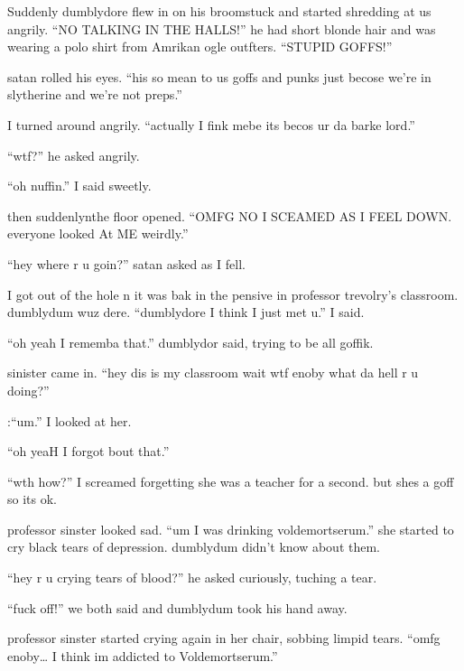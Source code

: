 Suddenly dumblydore flew in on his broomstuck and started shredding at us angrily. \enquote{NO TALKING IN THE HALLS\@!} he had short blonde hair and was wearing a polo shirt from Amrikan ogle outfters. \enquote{STUPID GOFFS\@!}

satan rolled his eyes. \enquote{his so mean to us goffs and punks just becose we're in slytherine and we're not preps.}

I turned around angrily. \enquote{actually I fink mebe its becos ur da barke lord.}

\enquote{wtf?} he asked angrily.

\enquote{oh nuffin.} I said sweetly.

then suddenlyn\dotfill the floor opened.\newline
\enquote{OMFG NO I SCEAMED AS I FEEL DOWN\@. everyone looked At ME weirdly.}

\enquote{hey where r u goin?} satan asked as I fell.

I got out of the hole n it was bak in the pensive in professor trevolry's classroom. dumblydum wuz dere. \enquote{dumblydore I think I just met u.} I said.

\enquote{oh yeah I rememba that.} dumblydor said, trying to be all goffik.

sinister came in. \enquote{hey dis is my classroom wait wtf enoby what da hell r u doing?}

:\enquote{um.} I looked at her.

\enquote{oh yeaH I forgot bout that.}

\enquote{wth how?} I screamed forgetting she was a teacher for a second. but shes a goff so its ok.

professor sinster looked sad. \enquote{um I was drinking voldemortserum.} she started to cry black tears of depression. dumblydum didn't know about them.

\enquote{hey r u crying tears of blood?} he asked curiously, tuching a tear.

\enquote{fuck off!} we both said and dumblydum took his hand away.

professor sinster started crying again in her chair, sobbing limp\-id tears. \enquote{omfg enoby\ldots{} I think im addicted to Voldemortserum.}


